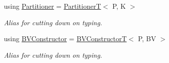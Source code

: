 \begin{DoxyCompactItemize}
\mbox{\label{classBVH_1_1NodeT_a3bb028655b8b961fa35109af1c14f281}} 
using \hyperlink{classBVH_1_1NodeT_a3bb028655b8b961fa35109af1c14f281}{Partitioner} = \hyperlink{namespaceBVH_a7c33d54da9893d506709b2ca96b76f55}{PartitionerT}$<$ P, K $>$
\begin{DoxyCompactList}\small\item\em Alias for cutting down on typing. \end{DoxyCompactList}\item 
\mbox{\label{classBVH_1_1NodeT_a2340f2466ed5b6eebab4bdc72004858e}} 
using \hyperlink{classBVH_1_1NodeT_a2340f2466ed5b6eebab4bdc72004858e}{B\+V\+Constructor} = \hyperlink{namespaceBVH_a245702d7eff40cdaedb5dff68c25a88a}{B\+V\+ConstructorT}$<$ P, BV $>$
\begin{DoxyCompactList}\small\item\em Alias for cutting down on typing. \end{DoxyCompactList}\end{DoxyCompactItemize}
